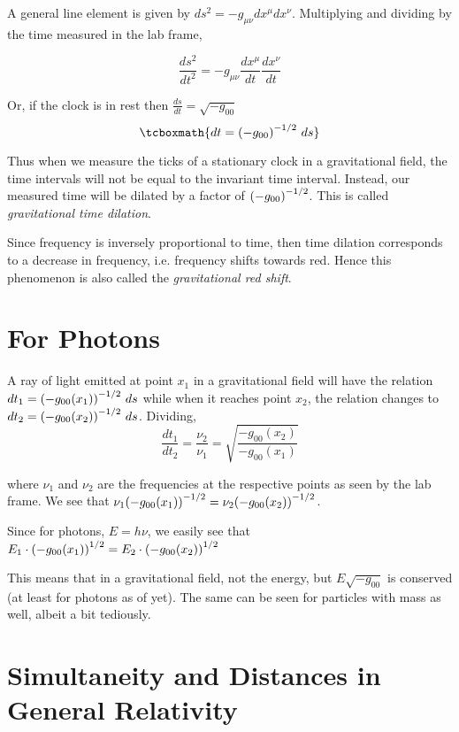 \documentclass[12pt, letterpaper]{report}
\begin{document}
A general line element is given by $ds^2= -g_{\mu\nu}dx^\mu dx^\nu$. Multiplying and dividing by the time measured in the lab frame, 

$$\frac{ds^2}{dt^2}= -g_{\mu\nu}\frac{dx^\mu}{dt} \frac{dx^\nu}{dt}$$

Or, if the clock is in rest then $\frac{ds}{dt}= \sqrt{-g_{00}}$
\begin{equation}
    \tcboxmath{dt= \qty(-g_{00})^{-1/2}\ ds} \label{eq2.1}   
\end{equation}

Thus when we measure the ticks of a stationary clock in a gravitational field, the time intervals will not be equal to the invariant time interval. Instead, our measured time will be dilated by a factor of $\qty(-g_{00})^{-1/2}$. This is called \emph{gravitational time dilation}. 

Since frequency is inversely proportional to time, then time dilation corresponds to a decrease in frequency, i.e. frequency shifts towards red. Hence this phenomenon is also called the \emph{gravitational red shift}. 

\section{For Photons}

A ray of light emitted at point $x_1$ in a gravitational field will have the relation $dt_1= \qty(-g_{00}(x_1))^{-1/2}\ ds$ while when it reaches point $x_2$, the relation changes to $dt_2= \qty(-g_{00}(x_2))^{-1/2}\ ds$. Dividing, 
$$\frac{dt_1}{dt_2}= \frac{\nu_2}{\nu_1}= \sqrt{\frac{-g_{00}(x_2)}{-g_{00}(x_1)}}$$

where $\nu_1$ and $\nu_2$ are the frequencies at the respective points as seen by the lab frame. We see that $\nu_1 \qty(-g_{00}(x_1))^{-1/2}= \nu_2 \qty(-g_{00}(x_2))^{-1/2}$. 

Since for photons, $E= h\nu$, we easily see that $E_1\cdot \qty(-g_{00}(x_1))^{1/2}= E_2\cdot \qty(-g_{00}(x_2))^{1/2}$

This means that in a gravitational field, not the energy, but $E\sqrt{-g_{00}}$ is conserved (at least for photons as of yet). The same can be seen for particles with mass as well, albeit a bit tediously.

\section{Simultaneity and Distances in General Relativity}
\end{document}
